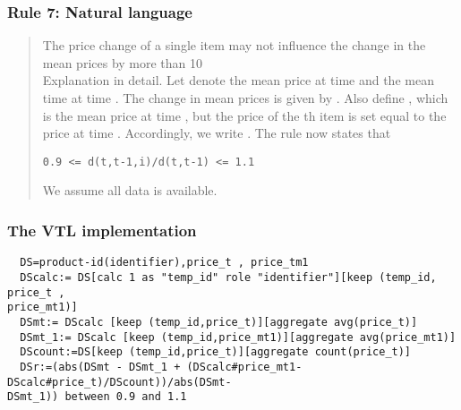 \subsubsection*{  Rule 7: Natural language}
\begin{quote}


The price change of a single item may not influence the change in the mean prices by more than 10\\%

Explanation in detail. Let  denote the mean price at time  and  the mean time at time .
The change in mean prices is given by . Also define , which is the
mean price at time , but the price of the th item is set equal to the price at time . Accordingly, we write . The rule now states that
\begin{verbatim}
0.9 <= d(t,t-1,i)/d(t,t-1) <= 1.1
\end{verbatim}

We assume all data is available.


\end{quote}
\subsubsection*{The VTL implementation}
\begin{verbatim}
  DS=product-id(identifier),price_t , price_tm1
  DScalc:= DS[calc 1 as "temp_id" role "identifier"][keep (temp_id, price_t ,
price_mt1)]
  DSmt:= DScalc [keep (temp_id,price_t)][aggregate avg(price_t)]
  DSmt_1:= DScalc [keep (temp_id,price_mt1)][aggregate avg(price_mt1)]
  DScount:=DS[keep (temp_id,price_t)][aggregate count(price_t)]
  DSr:=(abs(DSmt - DSmt_1 + (DScalc#price_mt1- DScalc#price_t)/DScount))/abs(DSmt-
DSmt_1)) between 0.9 and 1.1
\end{verbatim}
